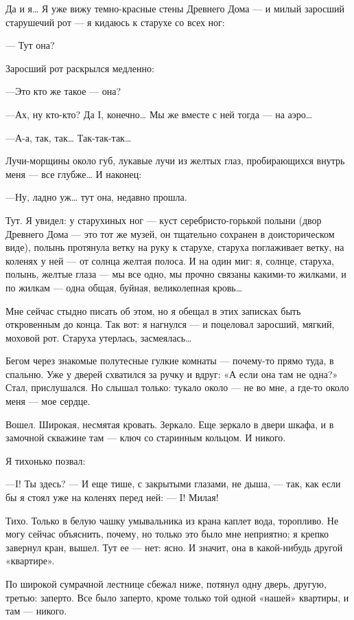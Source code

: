 \documentclass[11pt,openany]{book}
\begin{document}
Да и я\ldots{} Я уже вижу темно-красные стены Древнего Дома --- и милый заросший старушечий рот --- я кидаюсь к старухе со всех ног:

--- Тут она?

Заросший рот раскрылся медленно:

---Это кто же такое --- она?

---Ах, ну кто-кто? Да I, конечно\ldots{} Мы же вместе с ней тогда --- на аэро\ldots{}

---А-а, так, так\ldots{} Так-так-так\ldots{}

Лучи-морщины около губ, лукавые лучи из желтых глаз, пробирающихся внутрь меня --- все глубже\ldots{} И наконец:

---Ну, ладно уж\ldots{} тут она, недавно прошла.

Тут. Я увидел: у старухиных ног --- куст серебристо-горькой полыни (двор Древнего Дома --- это тот же музей, он тщательно сохранен в доисторическом виде), полынь протянула ветку на руку к старухе, старуха поглаживает ветку, на коленях у ней --- от солнца желтая полоса. И на один миг: я, солнце, старуха, полынь, желтые глаза --- мы все одно, мы прочно связаны какими-то жилками, и по жилкам --- одна общая, буйная, великолепная кровь\ldots{}

Мне сейчас стыдно писать об этом, но я обещал в этих записках быть откровенным до конца. Так вот: я нагнулся --- и поцеловал заросший, мягкий, моховой рот. Старуха утерлась, засмеялась\ldots{}

Бегом через знакомые полутесные гулкие комнаты --- почему-то прямо туда, в спальню. Уже у дверей схватился за ручку и вдруг: «А если она там не одна?» Стал, прислушался. Но слышал только: тукало около --- не во мне, а где-то около меня --- мое сердце.

Вошел. Широкая, несмятая кровать. Зеркало. Еще зеркало в двери шкафа, и в замочной скважине там --- ключ со старинным кольцом. И никого.

Я тихонько позвал:

---I! Ты здесь? --- И еще тише, с закрытыми глазами, не дыша, --- так, как если бы я стоял уже на коленях перед ней: --- I! Милая!

Тихо. Только в белую чашку умывальника из крана каплет вода, торопливо. Не могу сейчас объяснить, почему, но только это было мне неприятно; я крепко завернул кран, вышел. Тут ее --- нет: ясно. И значит, она в какой-нибудь другой «квартире».

По широкой сумрачной лестнице сбежал ниже, потянул одну дверь, другую, третью: заперто. Все было заперто, кроме только той одной «нашей» квартиры, и там --- никого.
\end{document}
